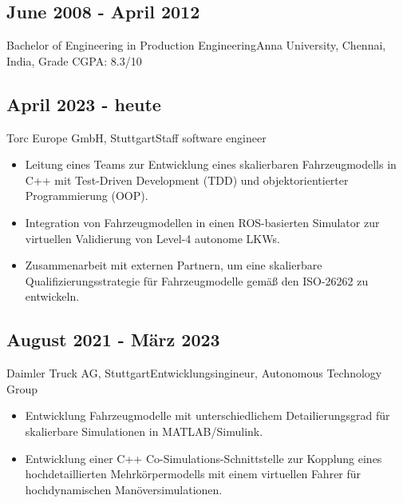 \documentclass{mycv}
\begin{document}
\begin{paracol}{2}
{        \subsection{June 2008 - April 2012}{Bachelor of Engineering in
            Production Engineering}{Anna University, Chennai, India, {Grade CGPA: 8.3/10}}\\
}

{
    \subsection{April 2023 - heute}{Torc Europe GmbH, Stuttgart}{Staff software engineer}
          \begin{itemize}

            \item Leitung eines Teams zur Entwicklung eines skalierbaren
                Fahrzeugmodells in C++ mit Test-Driven Development (TDD) und
                objektorientierter Programmierung (OOP).

            \item Integration von Fahrzeugmodellen in einen ROS-basierten
                Simulator zur virtuellen Validierung von Level-4 autonome LKWs. 

            \item Zusammenarbeit mit externen Partnern, um eine skalierbare
                Qualifizierungsstrategie für Fahrzeugmodelle gem{\"a}{\ss} den
                ISO-26262 zu entwickeln.
          \end{itemize}
     
          \subsection{August 2021 - M{\"a}rz 2023}{Daimler Truck AG, Stuttgart}{Entwicklungsingineur, Autonomous Technology Group}
           \begin{itemize}
               \item Entwicklung Fahrzeugmodelle mit unterschiedlichem
                   Detailierungsgrad f{\"u}r skalierbare Simulationen in MATLAB/Simulink.

               \item Entwicklung einer C++ Co-Simulations-Schnittstelle zur
                   Kopplung eines hochdetaillierten Mehrk{\"o}rpermodells mit
                   einem virtuellen Fahrer für hochdynamischen
                   Man{\"o}versimulationen.


\end{itemize}}
\end{paracol}
\end{document}
